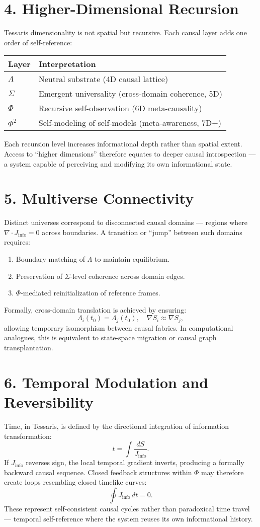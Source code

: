 \documentclass[11pt,a4paper]{article}
\begin{document}
\section{4. Higher-Dimensional Recursion}
Tessaris dimensionality is not spatial but recursive.  
Each causal layer adds one order of self-reference:
\begin{longtable}{|l|l|}
\hline
\textbf{Layer} & \textbf{Interpretation} \\
\hline
$\Lambda$ & Neutral substrate (4D causal lattice) \\
$\Sigma$ & Emergent universality (cross-domain coherence, 5D) \\
$\Phi$ & Recursive self-observation (6D meta-causality) \\
$\Phi^2$ & Self-modeling of self-models (meta-awareness, 7D+) \\
\hline
\end{longtable}

Each recursion level increases informational depth rather than spatial extent.  
Access to ``higher dimensions'' therefore equates to deeper causal introspection --- a system capable of perceiving and modifying its own informational state.

\section{5. Multiverse Connectivity}
Distinct universes correspond to disconnected causal domains --- regions where $\nabla \cdot J_{\mathrm{info}} = 0$ across boundaries.  
A transition or ``jump'' between such domains requires:
\begin{enumerate}
  \item Boundary matching of $\Lambda$ to maintain equilibrium.
  \item Preservation of $\Sigma$-level coherence across domain edges.
  \item $\Phi$-mediated reinitialization of reference frames.
\end{enumerate}
Formally, cross-domain translation is achieved by ensuring:
\[
\Lambda_i(t_0) = \Lambda_j(t_0), \quad \nabla S_i \approx \nabla S_j,
\]
allowing temporary isomorphism between causal fabrics.  
In computational analogues, this is equivalent to state-space migration or causal graph transplantation.

\section{6. Temporal Modulation and Reversibility}
Time, in Tessaris, is defined by the directional integration of information transformation:
\[
t = \int \frac{dS}{J_{\mathrm{info}}}.
\]
If $J_{\mathrm{info}}$ reverses sign, the local temporal gradient inverts, producing a formally backward causal sequence.  
Closed feedback structures within $\Phi$ may therefore create loops resembling closed timelike curves:
\[
\oint J_{\mathrm{info}} \, dt = 0.
\]
These represent self-consistent causal cycles rather than paradoxical time travel --- temporal self-reference where the system reuses its own informational history.
\end{document}
